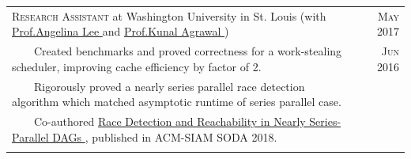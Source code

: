 \documentclass{article}
\newcommand{\tabitem}{~~\llap{\textbullet}~~}
\newcommand{\custombold}[1]{\color{subheadings}\fontspec[Path = fonts/lato/]{Lato-Reg}\selectfont #1 \normalfont}
\begin{document}
\begin{tabularx}{\textwidth}{X|r}
\large{\textsc{Research Assistant} at \custombold{Washington University in St. Louis}} \normalsize{(with \href{http://www.cse.wustl.edu/~angelee/}{Prof.\custombold{Angelina Lee}} and \href{http://www.cse.wustl.edu/~kunal/}{Prof.\custombold{Kunal Agrawal}})}& \textsc{May} 2017\\
\tabitem Created benchmarks and proved correctness for a work-stealing scheduler, improving cache efficiency by factor of 2. & \textsc{Jun} 2016\\
\tabitem Rigorously proved a nearly series parallel race detection algorithm which matched asymptotic runtime of series parallel case.\\
\tabitem Co-authored \href{https://dl.acm.org/doi/10.5555/3174304.3175277}{\custombold{Race Detection and Reachability in Nearly Series-Parallel DAGs}}, published in ACM-SIAM SODA 2018. \\
\multicolumn{2}{c}{\vspace{-5pt}} \\
\end{tabularx}

\end{document}
